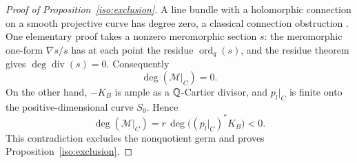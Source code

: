 \begin{proof}[Proof of Proposition~\ref{iso:exclusion}]
A line bundle with a holomorphic connection on a smooth projective
curve has degree zero, a classical connection obstruction
\cite{Atiyah1957}.  One elementary proof takes a nonzero
meromorphic section \(s\): the meromorphic one-form
\(\nabla s/s\) has at each point the residue
\(\operatorname{ord}_q(s)\), and the residue theorem gives
\(\deg\operatorname{div}(s)=0\).
Consequently
\[
                         \deg(\mathcal M|_C)=0.
\]
On the other hand, \(-K_B\) is ample as a \(\mathbb Q\)-Cartier divisor,
and \(p_l|_C\) is finite onto the positive-dimensional curve
\(S_0\).  Hence
\[
             \deg(\mathcal M|_C)
               =r\,\deg\bigl((p_l|_C)^*K_B\bigr)<0.
\]
This contradiction excludes the nonquotient germ and proves
Proposition~\ref{iso:exclusion}.
\end{proof}
